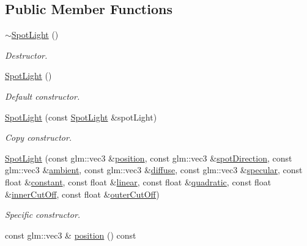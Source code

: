 \subsection*{Public Member Functions}
\begin{DoxyCompactItemize}
\item 
\hyperlink{classSpotLight_aa16b741d73aa198c203ce40a066a115c}{$\sim$\+Spot\+Light} ()
\begin{DoxyCompactList}\small\item\em Destructor. \end{DoxyCompactList}\item 
\hyperlink{classSpotLight_ae4045cd7c8c6d18af39b57c9cf6f9ce6}{Spot\+Light} ()
\begin{DoxyCompactList}\small\item\em Default constructor. \end{DoxyCompactList}\item 
\hyperlink{classSpotLight_a59cf2853bf97a548e05b876019c15e20}{Spot\+Light} (const \hyperlink{classSpotLight}{Spot\+Light} \&spot\+Light)
\begin{DoxyCompactList}\small\item\em Copy constructor. \end{DoxyCompactList}\item 
\hyperlink{classSpotLight_a5fba5c7e47bf73a436f96ba4b528e37a}{Spot\+Light} (const glm\+::vec3 \&\hyperlink{classSpotLight_abe749d17a6042232df070529dd2d1229}{position}, const glm\+::vec3 \&\hyperlink{classSpotLight_a9832f6f55fdd521b47e9c9eda8a9149b}{spot\+Direction}, const glm\+::vec3 \&\hyperlink{classSpotLight_a820fb8db9835283e3ed7793a8623d630}{ambient}, const glm\+::vec3 \&\hyperlink{classSpotLight_a84be0450fb59905a908b6e09f16bb2e7}{diffuse}, const glm\+::vec3 \&\hyperlink{classSpotLight_a2dd83ce57f35badb6c0147bf0aa56b02}{specular}, const float \&\hyperlink{classSpotLight_a950b700c0244974abac7a5985674f4c5}{constant}, const float \&\hyperlink{classSpotLight_ac55d82286a1219c99a32be7d996a5e7b}{linear}, const float \&\hyperlink{classSpotLight_af30e894a67433d26393c2014a9033f1e}{quadratic}, const float \&\hyperlink{classSpotLight_a591b58209ca0783c963ac42b5ff0dafb}{inner\+Cut\+Off}, const float \&\hyperlink{classSpotLight_a68177100b781d157b98a02b144938c51}{outer\+Cut\+Off})
\begin{DoxyCompactList}\small\item\em Specific constructor. \end{DoxyCompactList}\item 
const glm\+::vec3 \& \hyperlink{classSpotLight_abe749d17a6042232df070529dd2d1229}{position} () const 

\end{DoxyCompactItemize}
